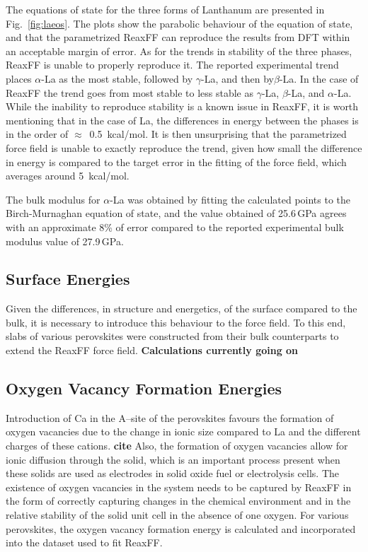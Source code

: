 \documentclass[journal=jpcafh,manuscript=article]{achemso}
\begin{document}
The equations of state for the three forms of Lanthanum are presented in Fig.~\ref{fig:laeos}.
The plots show the parabolic behaviour of the equation of state, and that the parametrized ReaxFF can reproduce the results from DFT within an acceptable margin of error.
As for the trends in stability of the three phases, ReaxFF is unable to properly reproduce it.
The reported experimental trend places $\alpha$-La as the most stable, followed by $\gamma$-La, and then by$\beta$-La.
In the case of ReaxFF the trend goes from most stable to less stable as $\gamma$-La, $\beta$-La, and $\alpha$-La.
While the inability to reproduce stability is a known issue in ReaxFF, it is worth mentioning that in the case of La, the differences in energy between the phases is in the order of $\approx$~0.5~kcal/mol.
It is then unsurprising that the parametrized force field is unable to exactly reproduce the trend,  given how small the difference in energy is compared to the target error in the fitting of the force field, which averages around 5~kcal/mol.

The bulk modulus for $\alpha$-La was obtained by fitting the calculated points to the Birch-Murnaghan equation of state\cite{fu_first-principles_1983}, and the value obtained of 25.6\,GPa agrees with an approximate 8\% of error compared to the reported experimental bulk modulus value of 27.9\,GPa.\cite{lide2003crc}

\subsection{Surface Energies}

Given the differences, in structure and energetics, of the surface compared to the bulk, it is necessary to introduce this behaviour to the force field.
To this end, slabs of various perovskites were constructed from their bulk counterparts to extend the ReaxFF force field.
\textbf{Calculations currently going on}

\subsection{Oxygen Vacancy Formation Energies}

Introduction of Ca in the A--site of the perovskites favours the formation of oxygen vacancies due to the change in ionic size compared to La and the different charges of these cations. \textbf{cite}
Also, the formation of oxygen vacancies allow for ionic diffusion through the solid, which is an important process present when these solids are used as electrodes in solid oxide fuel or electrolysis cells.
The existence of oxygen vacancies in the system needs to be captured by ReaxFF in the form of correctly capturing changes in the chemical environment and in the relative stability of the solid unit cell in the absence of one oxygen.
For various perovskites, the oxygen vacancy formation energy is calculated and incorporated into the dataset used to fit ReaxFF.
\end{document}
